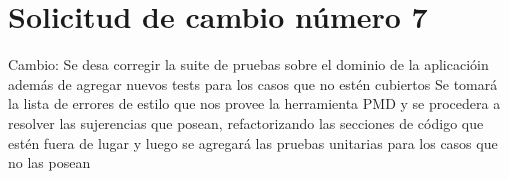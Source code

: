 \section{Solicitud de cambio número 7}
Cambio: Se desa corregir la suite de pruebas sobre el dominio de la aplicacióin además de agregar nuevos tests para los casos que no estén cubiertos
Se tomará la lista de errores de estilo que nos provee la herramienta PMD y se procedera a resolver las sujerencias que posean, refactorizando las secciones de código que estén fuera de lugar y luego se agregará las pruebas unitarias para los casos que no las posean
